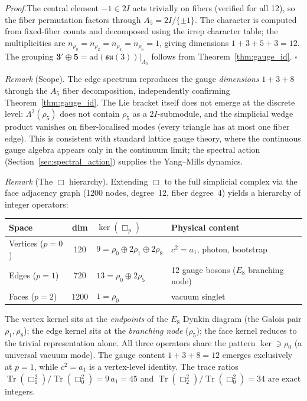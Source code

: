 \documentclass[12pt,a4paper]{article}
\theoremstyle{definition}
\begin{document}
\noindent\textit{Proof.}\enspace The central element $-1 \in 2I$ acts trivially on fibers (verified for all 12), so the fiber permutation factors through $A_5 = 2I/\{\pm 1\}$.  The character is computed from fixed-fiber counts and decomposed using the irrep character table; the multiplicities are $n_{\rho_0} = n_{\rho_2} = n_{\rho_4} = n_{\rho_6} = 1$, giving dimensions $1 + 3 + 5 + 3 = 12$.  The grouping $\mathbf{3'} \oplus \mathbf{5} = \mathrm{ad}(\mathfrak{su}(3))|_{A_5}$ follows from Theorem~\ref{thm:gauge_id}.  \hfill$\square$

\smallskip

\noindent\textit{Remark} (Scope).  The edge spectrum reproduces the gauge \emph{dimensions} $1 + 3 + 8$ through the $A_5$ fiber decomposition, independently confirming Theorem~\ref{thm:gauge_id}.  The Lie bracket itself does not emerge at the discrete level: $\Lambda^2(\rho_5)$ does not contain $\rho_5$ as a $2I$-submodule, and the simplicial wedge product vanishes on fiber-localised modes (every triangle has at most one fiber edge).  This is consistent with standard lattice gauge theory, where the continuous gauge algebra appears only in the continuum limit; the spectral action (Section~\ref{sec:spectral_action}) supplies the Yang--Mills dynamics.

\noindent\textit{Remark} (The $\Box$ hierarchy).  Extending $\Box$ to the full simplicial complex via the face adjacency graph (1200 nodes, degree~12, fiber degree~4) yields a hierarchy of integer operators:
\begin{center}\small
\begin{tabular}{lcll}
\toprule
\textbf{Space} & \textbf{dim} & \textbf{$\ker(\Box_p)$} & \textbf{Physical content}\\
\midrule
Vertices ($p=0$) & 120 & $9 = \rho_0 \oplus 2\rho_1 \oplus 2\rho_8$ & $c^2 = a_1$, photon, bootstrap \\
Edges ($p=1$) & 720 & $13 = \rho_0 \oplus 2\rho_5$ & 12 gauge bosons ($E_8$ branching node) \\
Faces ($p=2$) & 1200 & $1 = \rho_0$ & vacuum singlet \\
\bottomrule
\end{tabular}
\end{center}
The vertex kernel sits at the \emph{endpoints} of the $E_8$ Dynkin diagram (the Galois pair $\rho_1, \rho_8$); the edge kernel sits at the \emph{branching node} ($\rho_5$); the face kernel reduces to the trivial representation alone.  All three operators share the pattern $\ker \ni \rho_0$ (a universal vacuum mode).  The gauge content $1 + 3 + 8 = 12$ emerges exclusively at $p = 1$, while $c^2 = a_1$ is a vertex-level identity.  The trace ratios $\operatorname{Tr}(\Box_1^2)/\operatorname{Tr}(\Box_0^2) = 9\,a_1 = 45$ and $\operatorname{Tr}(\Box_2^2)/\operatorname{Tr}(\Box_0^2) = 34$ are exact integers.
\end{document}
